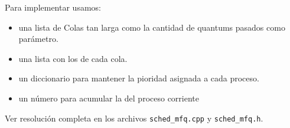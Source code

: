Para implementar \mfq usamos:

\begin{itemize}
 \item una lista de Colas tan larga como la cantidad de quantums pasados como par\'ametro.
 \item una lista con los \quantums de cada cola.
 \item un diccionario para mantener la pioridad asignada a cada proceso.
 \item un n\'umero para acumular la \quota del proceso corriente
\end{itemize}

Ver resoluci\'on completa en los archivos \verb|sched_mfq.cpp| y \verb|sched_mfq.h|.
